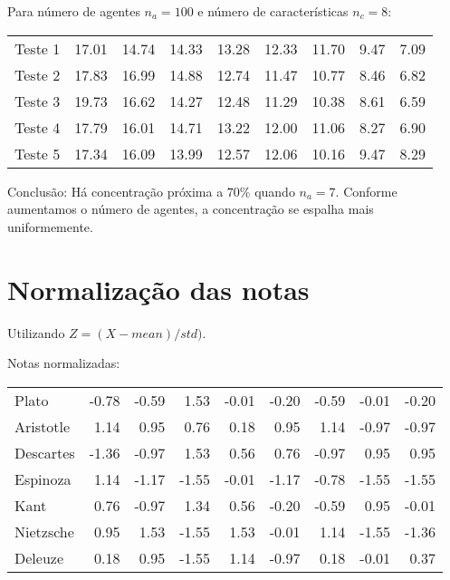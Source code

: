\documentclass[11pt]{article}
\begin{document}
  Para número de agentes $n_a = 100$ e número de características $n_c = 8$:


\begin{center}
\begin{tabular}{lrrrrrrrr}
 Teste 1  &  17.01  &  14.74  &  14.33  &  13.28  &  12.33  &  11.70  &  9.47  &  7.09  \\
 Teste 2  &  17.83  &  16.99  &  14.88  &  12.74  &  11.47  &  10.77  &  8.46  &  6.82  \\
 Teste 3  &  19.73  &  16.62  &  14.27  &  12.48  &  11.29  &  10.38  &  8.61  &  6.59  \\
 Teste 4  &  17.79  &  16.01  &  14.71  &  13.22  &  12.00  &  11.06  &  8.27  &  6.90  \\
 Teste 5  &  17.34  &  16.09  &  13.99  &  12.57  &  12.06  &  10.16  &  9.47  &  8.29  \\
\end{tabular}
\end{center}



  Conclusão: Há concentração próxima a $70 \%$ quando $n_a = 7$. Conforme aumentamos o número de agentes,
  a concentração se espalha mais uniformemente.
\section{Normalização das notas}
\label{sec-2}


  Utilizando $Z = (X - mean)/std)$.

  Notas normalizadas:


\begin{center}
\begin{tabular}{lrrrrrrrr}
 Plato      &  -0.78  &  -0.59  &   1.53  &  -0.01  &  -0.20  &  -0.59  &  -0.01  &  -0.20  \\
 Aristotle  &   1.14  &   0.95  &   0.76  &   0.18  &   0.95  &   1.14  &  -0.97  &  -0.97  \\
 Descartes  &  -1.36  &  -0.97  &   1.53  &   0.56  &   0.76  &  -0.97  &   0.95  &   0.95  \\
 Espinoza   &   1.14  &  -1.17  &  -1.55  &  -0.01  &  -1.17  &  -0.78  &  -1.55  &  -1.55  \\
 Kant       &   0.76  &  -0.97  &   1.34  &   0.56  &  -0.20  &  -0.59  &   0.95  &  -0.01  \\
 Nietzsche  &   0.95  &   1.53  &  -1.55  &   1.53  &  -0.01  &   1.14  &  -1.55  &  -1.36  \\
 Deleuze    &   0.18  &   0.95  &  -1.55  &   1.14  &  -0.97  &   0.18  &  -0.01  &   0.37  \\
\end{tabular}
\end{center}
\end{document}
